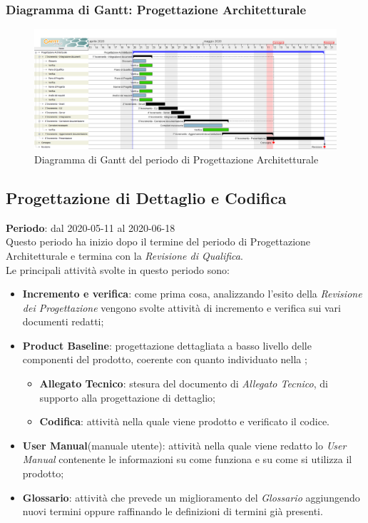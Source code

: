 	\subsubsection{Diagramma di Gantt: Progettazione Architetturale}
		\begin{figure}[h]
			\centering
			\includegraphics[width=1.1\textwidth]{./res/img/DiagrammiGantt/prog_arch_gantt.png}
			\caption{Diagramma di Gantt del periodo di Progettazione Architetturale}
		\end{figure}
\newpage
\subsection{Progettazione di Dettaglio e Codifica}
\textbf{Periodo}: dal 2020-05-11 al 2020-06-18 \\
Questo periodo ha inizio dopo il termine del periodo di Progettazione Architetturale e termina con la \textit{Revisione di Qualifica}. \\
Le principali attività svolte in questo periodo sono:
\begin{itemize}
	\item \textbf{Incremento e verifica}: come prima cosa, analizzando l'esito della \textit{Revisione dei Progettazione} vengono svolte attività di incremento e verifica sui vari documenti redatti;
	\item \textbf{Product Baseline}: progettazione dettagliata a basso livello delle componenti del prodotto, coerente con quanto individuato nella \TB{};
	\begin{itemize}
		\item \textbf{Allegato Tecnico}: stesura del documento di \textit{Allegato Tecnico}, di supporto alla progettazione di dettaglio;
		\item \textbf{Codifica}: attività nella quale viene prodotto e verificato il codice.
	\end{itemize}
	\item \textbf{User Manual}(manuale utente): attività nella quale viene redatto lo \textit{User Manual} contenente le informazioni su come funziona e su come si utilizza il prodotto;
	\item \textbf{Glossario}: attività che prevede un miglioramento del \textit{Glossario} aggiungendo nuovi termini oppure raffinando le definizioni di termini già presenti.
\end{itemize}
